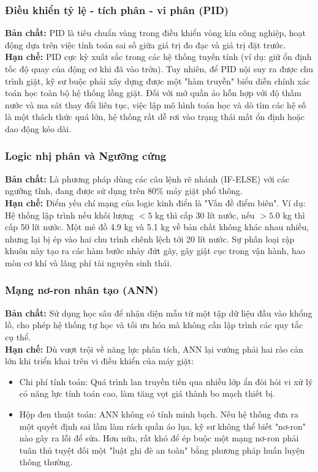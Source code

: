 \documentclass[12pt, a4paper]{article}
\begin{document}
\subsubsection{Điều khiển tỷ lệ - tích phân - vi phân (PID)}
\textbf{Bản chất:} PID là tiêu chuẩn vàng trong điều khiển vòng kín công nghiệp, hoạt động dựa trên việc tính toán sai số giữa giá trị đo đạc và giá trị đặt trước.\\
\textbf{Hạn chế:} PID cực kỳ xuất sắc trong các hệ thống tuyến tính (ví dụ: giữ ổn định tốc độ quay của động cơ khi đã vào trớn). Tuy nhiên, để PID nội suy ra được chu trình giặt, kỹ sư buộc phải xây dựng được một "hàm truyền" biểu diễn chính xác toán học toàn bộ hệ thống lồng giặt. Đối với mớ quần áo hỗn hợp với độ thấm nước và ma sát thay đổi liên tục, việc lập mô hình toán học và dò tìm các hệ số là một thách thức quá lớn, hệ thống rất dễ rơi vào trạng thái mất ổn định hoặc dao động kéo dài.

\subsubsection{Logic nhị phân và Ngưỡng cứng}
\textbf{Bản chất:} Là phương pháp dùng các câu lệnh rẽ nhánh (IF-ELSE) với các ngưỡng tĩnh, đang được sử dụng trên 80\% máy giặt phổ thông.\\
\textbf{Hạn chế:} Điểm yếu chí mạng của logic kinh điển là "Vấn đề điểm biên". Ví dụ: Hệ thống lập trình nếu khối lượng $< 5$ kg thì cấp 30 lít nước, nếu $> 5.0$ kg thì cấp 50 lít nước. Một mẻ đồ 4.9 kg và 5.1 kg về bản chất không khác nhau nhiều, nhưng lại bị ép vào hai chu trình chênh lệch tới 20 lít nước. Sự phân loại rập khuôn này tạo ra các hàm bước nhảy đứt gãy, gây giật cục trong vận hành, hao mòn cơ khí và lãng phí tài nguyên sinh thái.

\subsubsection{Mạng nơ-ron nhân tạo (ANN)}
\textbf{Bản chất:} Sử dụng học sâu để nhận diện mẫu từ một tập dữ liệu đầu vào khổng lồ, cho phép hệ thống tự học và tối ưu hóa mà không cần lập trình các quy tắc cụ thể.\\
\textbf{Hạn chế:} Dù vượt trội về năng lực phân tích, ANN lại vướng phải hai rào cản lớn khi triển khai trên vi điều khiển của máy giặt:
\begin{itemize}
    \item Chi phí tính toán: Quá trình lan truyền tiến qua nhiều lớp ẩn đòi hỏi vi xử lý có năng lực tính toán cao, làm tăng vọt giá thành bo mạch thiết bị.
    \item Hộp đen thuật toán: ANN không có tính minh bạch. Nếu hệ thống đưa ra một quyết định sai lầm làm rách quần áo lụa, kỹ sư không thể biết "nơ-ron" nào gây ra lỗi để sửa. Hơn nữa, rất khó để ép buộc một mạng nơ-ron phải tuân thủ tuyệt đối một "luật ghi đè an toàn" bằng phương pháp huấn luyện thông thường.
\end{itemize}
\end{document}
